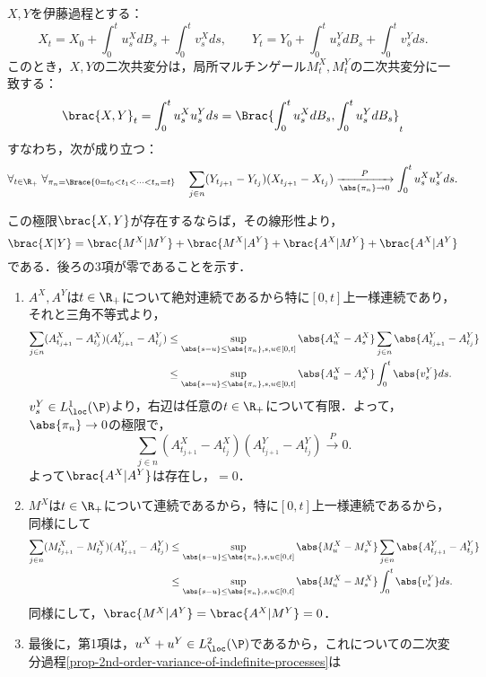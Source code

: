 \documentclass[uplatex,dvipdfmx]{jsreport}
\begin{document}
\begin{proposition}[伊藤過程の二次共変分]\label{prop-quadratic-covariation-of-ito-process}
    $X,Y$を伊藤過程とする：
    \[X_t=X_0+\int^t_0u^X_sdB_s+\int^t_0v_s^Xds,\qquad Y_t=Y_0+\int^t_0u_s^YdB_s+\int^t_0v_s^Yds.\]
    このとき，$X,Y$の二次共変分は，局所マルチンゲール$M_t^X,M_t^Y$の二次共変分に一致する：
    \[\brac{X,Y}_t=\int^t_0u_s^Xu_s^Yds=\Brac{\int^t_0u_s^XdB_s,\int^t_0u_s^YdB_s}_t\]
    すなわち，次が成り立つ：
    \[\forall_{t\in\R_+}\;\forall_{\pi_n=\Brace{0=t_0<t_1<\cdots<t_n=t}}\quad\sum_{j\in n}(Y_{t_{j+1}}-Y_{t_j})(X_{t_{j+1}}-X_{t_j})\xrightarrow[\abs{\pi_n}\to0]{P}\int^t_0u^X_su^Y_sds.\]
\end{proposition}
\begin{Proof}
    この極限$\brac{X,Y}$が存在するならば，その線形性より，
    \[\brac{X|Y}=\brac{M^X|M^Y}+\brac{M^X|A^Y}+\brac{A^X|M^Y}+\brac{A^X|A^Y}\]
    である．後ろの3項が零であることを示す．
    \begin{enumerate}
        \item $A^X,A^Y$は$t\in\R_+$について絶対連続であるから特に$[0,t]$上一様連続であり，それと三角不等式より，
        \begin{align*}
            \sum_{j\in n}(A^X_{t_{j+1}}-A^X_{t_j})(A^Y_{t_{j+1}}-A^Y_{t_j})&\le\sup_{\abs{s-u}\le\abs{\pi_n},s,u\in[0,t]}\abs{A^X_u-A^X_s}\sum_{j\in n}\abs{A^Y_{t_{j+1}}-A^Y_{t_j}}\\
            &\le\sup_{\abs{s-u}\le\abs{\pi_n},s,u\in[0,t]}\abs{A^X_u-A^X_s}\int^t_0\abs{v_s^Y}ds.
        \end{align*}
        $v_s^Y\in L^1_\loc(\P)$より，右辺は任意の$t\in\R_+$について有限．よって，$\abs{\pi_n}\to0$の極限で，
        \[\sum_{j\in n}(A^X_{t_{j+1}}-A^X_{t_j})(A^Y_{t_{j+1}}-A^Y_{t_j})\xrightarrow{P}0.\]
        よって$\brac{A^X|A^Y}$は存在し，$=0$．
        \item $M^X$は$t\in\R_+$について連続であるから，特に$[0,t]$上一様連続であるから，同様にして
        \begin{align*}
            \sum_{j\in n}(M^X_{t_{j+1}}-M^X_{t_j})(A^Y_{t_{j+1}}-A^Y_{t_j})&\le\sup_{\abs{s-u}\le\abs{\pi_n},s,u\in[0,t]}\abs{M^X_u-M^X_s}\sum_{j\in n}\abs{A^Y_{t_{j+1}}-A^Y_{t_j}}\\
            &\le\sup_{\abs{s-u}\le\abs{\pi_n},s,u\in[0,t]}\abs{M^X_u-M^X_s}\int^t_0\abs{v_s^Y}ds.
        \end{align*}
        同様にして，$\brac{M^X|A^Y}=\brac{A^X|M^Y}=0$．
        \item 最後に，第1項は，$u^X+u^Y\in L^2_\loc(\P)$であるから，これについての二次変分過程\ref{prop-2nd-order-variance-of-indefinite-processes}は

\end{enumerate}
\end{Proof}
\end{document}
